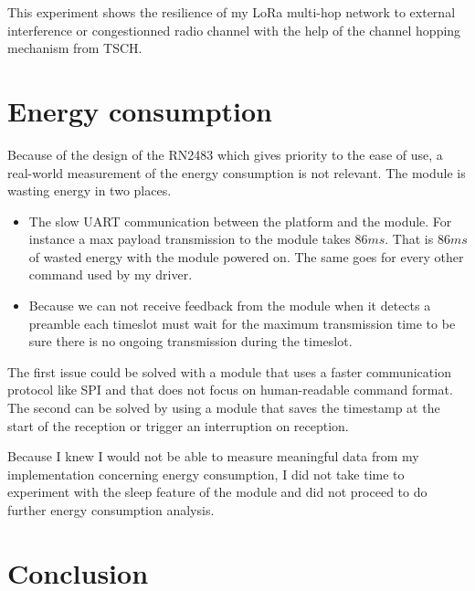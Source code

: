 This experiment shows the resilience of my LoRa multi-hop network to external
interference or congestionned radio channel with the help of the channel hopping
mechanism from TSCH.

\section{Energy consumption\label{section:energyconsumption}}

Because of the design of the RN2483 which gives priority to the ease of use,
a real-world measurement of the energy consumption is not relevant.
The module is wasting energy in two places.

\begin{itemize}
  \item The slow UART communication between the platform and the module. For
    instance a max payload transmission to the module takes $86 ms$.
    That is $86 ms$ of wasted energy with the module powered on. The same goes
    for every other command used by my driver.
  \item Because we can not receive feedback from the module when it detects a
    preamble each timeslot must wait for the maximum transmission time to be
    sure there is no ongoing transmission during the timeslot.
\end{itemize}


The first issue could be solved with a module that uses a faster communication
protocol like SPI and that does not focus on human-readable command format.
The second can be solved by using a module that saves the timestamp at the start
of the reception or trigger an interruption on reception.

Because I knew I would not be able to measure meaningful data from my
implementation concerning energy consumption, I did not take time to experiment
with the sleep feature of the module and did not proceed to do further energy
consumption analysis.

\section{Conclusion}

